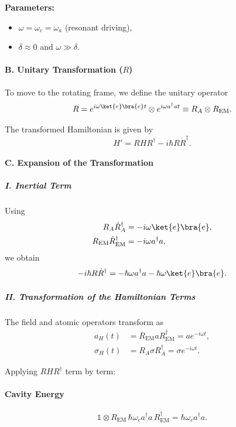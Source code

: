 \noindent
\textbf{Parameters:}
\begin{itemize}
    \item $\omega = \omega_c = \omega_a$ (resonant driving),
    \item $\delta \approx 0$ and $\omega \gg \delta$.
\end{itemize}

\paragraph{B. Unitary Transformation ($R$)}

To move to the rotating frame, we define the unitary operator
\begin{equation}
R
=
e^{i \omega \ket{e}\bra{e} t}
\otimes
e^{i \omega a^\dagger a t}
\equiv
R_A \otimes R_{\mathrm{EM}} .
\end{equation}

The transformed Hamiltonian is given by
\begin{equation}
H'
=
R H R^\dagger
-
i \hbar R \dot{R}^\dagger .
\end{equation}

\paragraph{C. Expansion of the Transformation}

\subparagraph{I. Inertial Term}

Using
\begin{align}
R_A \dot{R}_A^\dagger &= - i \omega \ket{e}\bra{e}, \\
R_{\mathrm{EM}} \dot{R}_{\mathrm{EM}}^\dagger &= - i \omega a^\dagger a ,
\end{align}
we obtain
\begin{equation}
- i \hbar R \dot{R}^\dagger
=
- \hbar \omega a^\dagger a
-
\hbar \omega \ket{e}\bra{e}.
\end{equation}

\subparagraph{II. Transformation of the Hamiltonian Terms}

The field and atomic operators transform as
\begin{align}
a_H(t) &= R_{\mathrm{EM}} a R_{\mathrm{EM}}^\dagger = a e^{-i\omega t}, \\
\sigma_H(t) &= R_A \sigma R_A^\dagger = \sigma e^{-i\omega t}.
\end{align}

Applying $R H R^\dagger$ term by term:

\paragraph{Cavity Energy}
\begin{equation}
\mathbb{1} \otimes
R_{\mathrm{EM}} \, \hbar \omega_c a^\dagger a \, R_{\mathrm{EM}}^\dagger
=
\hbar \omega_c a^\dagger a .
\end{equation}

